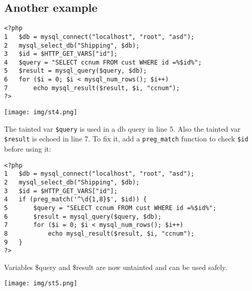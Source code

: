 \documentclass[a4paper, 10pt, titlepage]{article}
\begin{document}
\subsection{Another example}
\begin{lstlisting}
<?php
1 	$db = mysql_connect("localhost", "root", "asd");
2 	mysql_select_db("Shipping", $db);
3 	$id = $HTTP_GET_VARS["id"];
4 	$query = "SELECT ccnum FROM cust WHERE id =%$id%";
5 	$result = mysql_query($query, $db);
6 	for ($i = 0; $i < mysql_num_rows(); $i++)
7		echo mysql_result($result, $i, "ccnum");
?>
\end{lstlisting}
\begin{center}
\texttt{[image: img/st4.png]}
\end{center}
The tainted var \lstinline|$query| is used in a db query in line 5. Also the tainted var \lstinline|$result| is echoed in line 7. To fix it, add a \lstinline|preg_match| function to check \lstinline|$id| before using it:
\begin{lstlisting}
<?php
1 	$db = mysql_connect("localhost", "root", "asd");
2 	mysql_select_db("Shipping", $db);
3 	$id = $HTTP_GET_VARS["id"];
4 	if (preg_match('^\d{1,8}$', $id)) {
5		$query = "SELECT ccnum FROM cust WHERE id =%$id%";
6 		$result = mysql_query($query, $db);
7 		for ($i = 0; $i < mysql_num_rows(); $i++)
8			echo mysql_result($result, $i, "ccnum");
9	}
?>
\end{lstlisting}
Variables \$query and \$result are now untainted and can be used safely.
\begin{center}
\texttt{[image: img/st5.png]}
\end{center}

\newpage
\end{document}
